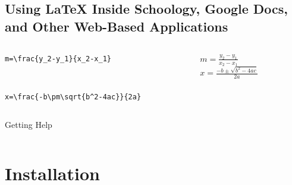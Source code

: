 \documentclass[aspectratio=169,mathserif,8pt,xcolor=table,notes=show]{beamer}
\begin{document}
	\subsection[Using \LaTeX ~Code]{Using LaTeX Inside Schoology, Google Docs, and Other Web-Based Applications} %
	\label{sub:using_latex_inside_schoology_google_docs_and_other_web_based_applications}
		\begin{frame}[fragile]
			\begin{columns}
				\begin{column}{6cm}
					\begin{lstlisting}
m=\frac{y_2-y_1}{x_2-x_1}
					\end{lstlisting}
					\quad\\[.5in]

					\begin{lstlisting}
x=\frac{-b\pm\sqrt{b^2-4ac}}{2a}
					\end{lstlisting}
				\end{column}
				\begin{column}{4cm}
				$m=\frac{y_2-y_1}{x_2-x_1}$\\[.5in]
				$x=\frac{-b\pm\sqrt{b^2-4ac}}{2a}$

				\end{column}
			\end{columns}
		\end{frame}

		\begin{frame}[t]{}
			\centering \Huge{Getting Help}\\
			\begin{columns}[T]
				\begin{column}{.5\textwidth}
				\end{column}
				\begin{column}{.5\textwidth}
				\end{column}
			\end{columns}
		\end{frame}

\section{Installation} %
\label{sec:installation}
\end{document}
